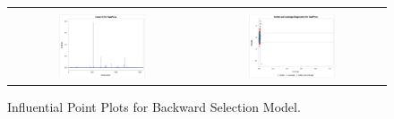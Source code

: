 \documentclass[11pt]{scrartcl} %
\begin{document}
\begin{figure}[H] %
	\centering
	\begin{tabular}{p{} p{}}
\hline	
	\multicolumn{1}{|c}{} &  \multicolumn{1}{c|}{} \\
		\multicolumn{1}{|c}{\includegraphics[width=0.48\textwidth]{../graphics/A2BWcooks}} &
		\multicolumn{1}{c|}{\includegraphics[width=0.48\textwidth]{../graphics/A2BWlev}}\\
		\hline
	\end{tabular}		
	\caption{Influential Point Plots for Backward Selection Model.} %
	\label{fig:A2BWIP}
\end{figure}
\end{document}
